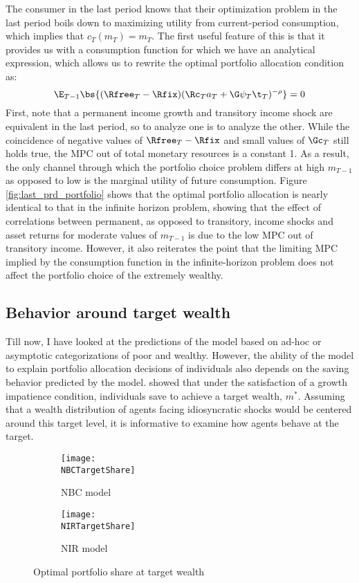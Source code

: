 The consumer in the last period knows that their optimization problem in the last period boils down to maximizing utility from current-period consumption, which implies that $c_T(m_T) = m_T$. The first useful feature of this is that it provides us with a consumption function for which we have an analytical expression, which allows us to rewrite the optimal portfolio allocation condition as:
\[
\E_{T-1}\bs{(\Rfree_{T} - \Rfix)(\Rc_{T}a_{T} + \G\psi_{T}\t_{T})^{-\rho}} = 0
\]
First, note that a permanent income growth and transitory income shock are equivalent in the last period, so to analyze one is to analyze the other. While the coincidence of negative values of $\Rfree_{T} - \Rfix$ and small values of $\Gc_{T}$ still holds true, the MPC out of total monetary resources is a constant 1. As a result, the only channel through which the portfolio choice problem differs at high $m_{T-1}$ as opposed to low is the marginal utility of future consumption. Figure \ref{fig:last_prd_portfolio} shows that the optimal portfolio allocation is nearly identical to that in the infinite horizon problem, showing that the effect of correlations between permanent, as opposed to transitory, income shocks and asset returns for moderate values of $m_{T-1}$ is due to the low MPC out of transitory income. However, it also reiterates the point that the limiting MPC implied by the consumption function in the infinite-horizon problem does not affect the portfolio choice of the extremely wealthy.

\subsection{Behavior around target wealth}\label{target_wealth}

Till now, I have looked at the predictions of the model based on ad-hoc or asymptotic categorizations of poor and wealthy. However, the ability of the model to explain portfolio allocation decisions of individuals also depends on the saving behavior predicted by the model. \citet{Deaton1991} showed that under the satisfaction of a growth impatience condition, individuals save to achieve a target wealth, $m^*$. Assuming that a wealth distribution of agents facing idiosyncratic shocks would be centered around this target level, it is informative to examine how agents behave at the target.

\begin{figure}[h]
    \centering
    \begin{subfigure}{0.49\textwidth}
        \centering
        \texttt{[image: \\NBCTargetShare]}
        \caption{NBC model}
        \label{subfig:targetShare_NBC}
    \end{subfigure}
    \begin{subfigure}{0.49\textwidth}
        \centering
        \texttt{[image: \\NIRTargetShare]}
        \caption{NIR model}
        \label{subfig:targetShare_NIR}
    \end{subfigure}
    \caption{Optimal portfolio share at target wealth}
    \label{fig:targetShare}
\end{figure}

